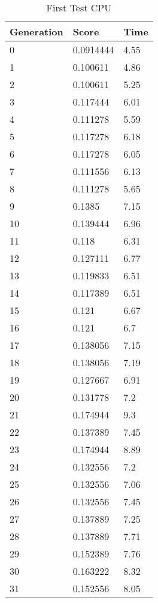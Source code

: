 \begin{table}
\caption{First Test CPU}
\centering
 \begin{tabular}{ | l | l | l |}
    \hline
    Generation & Score & Time \\ \hline
    0 & 0.0914444 & 4.55 \\ \hline
    1 & 0.100611 & 4.86 \\ \hline
    2 & 0.100611 & 5.25 \\ \hline
    3 & 0.117444 & 6.01 \\ \hline
    4 & 0.111278 & 5.59 \\ \hline
    5 & 0.117278 & 6.18 \\ \hline
    6 & 0.117278 & 6.05 \\ \hline
    7 & 0.111556 & 6.13 \\ \hline
    8 & 0.111278 & 5.65 \\ \hline
    9 & 0.1385 & 7.15 \\ \hline
    10 & 0.139444 & 6.96 \\ \hline
    11 & 0.118 & 6.31 \\ \hline
    12 & 0.127111 & 6.77 \\ \hline
    13 & 0.119833 & 6.51 \\ \hline
    14 & 0.117389 & 6.51 \\ \hline
    15 & 0.121 & 6.67 \\ \hline
    16 & 0.121 & 6.7 \\ \hline
    17 & 0.138056 & 7.15 \\ \hline
    18 & 0.138056 & 7.19 \\ \hline
    19 & 0.127667 & 6.91 \\ \hline
    20 & 0.131778 & 7.2 \\ \hline
    21 & 0.174944 & 9.3 \\ \hline
    22 & 0.137389 & 7.45 \\ \hline
    23 & 0.174944 & 8.89 \\ \hline
    24 & 0.132556 & 7.2 \\ \hline
    25 & 0.132556 & 7.06 \\ \hline
    26 & 0.132556 & 7.45 \\ \hline
    27 & 0.137889 & 7.25 \\ \hline
    28 & 0.137889 & 7.71 \\ \hline
    29 & 0.152389 & 7.76 \\ \hline
    30 & 0.163222 & 8.32 \\ \hline
    31 & 0.152556 & 8.05 \\ \hline

\end{tabular}
\end{table}
